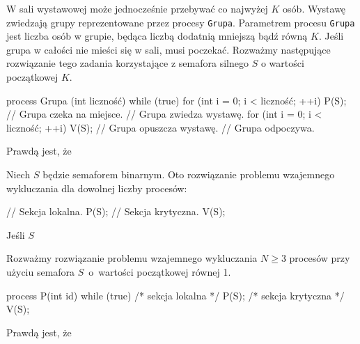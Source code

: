 \begin{problems}
    \prob W sali wystawowej może jednocześnie przebywać co najwyżej $K$ osób. Wystawę zwiedzają grupy reprezentowane przez procesy \texttt{Grupa}. Parametrem procesu \texttt{Grupa} jest liczba osób w grupie, będąca liczbą dodatnią mniejszą bądź równą $K$. Jeśli grupa w całości nie mieści się w sali, musi poczekać. Rozważmy następujące rozwiązanie tego zadania korzystające z semafora silnego $S$ o wartości początkowej $K$.
    \begin{java}
        process Grupa (int liczność) {
            while (true) {
                for (int i = 0; i < liczność; ++i) P(S); // Grupa czeka na miejsce.
                // Grupa zwiedza wystawę.
                for (int i = 0; i < liczność; ++i) V(S); // Grupa opuszcza wystawę.
                // Grupa odpoczywa.
            }
        }
    \end{java}
    Prawdą jest, że

    \prob Niech $S$ będzie semaforem binarnym. Oto rozwiązanie problemu wzajemnego wykluczania dla dowolnej liczby procesów:
    \begin{java}
        // Sekcja lokalna.
        P(S);
        // Sekcja krytyczna.
        V(S);
    \end{java}
    Jeśli $S$
    
    \prob Rozważmy rozwiązanie problemu wzajemnego wykluczania $N \geq 3$ procesów przy użyciu semafora $S$~o~wartości początkowej równej 1.
    \begin{cpp}
        process P(int id) {
            while (true) {
                /* sekcja lokalna */
                P(S);
                /* sekcja krytyczna */
                V(S);
            }
        }
    \end{cpp}
    Prawdą jest, że
\end{problems}

